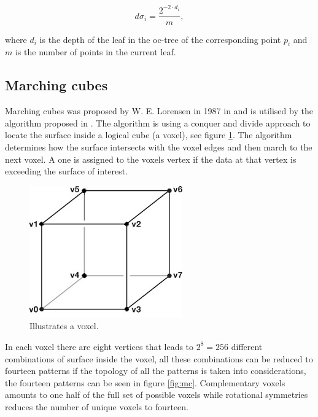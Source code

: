 \begin{equation}
	d \sigma_i = \frac{2^{-2 \cdot d_i}}{m},
	\label{eq:diff_area}
\end{equation}

\noindent where $d_i$ is the depth of the leaf in the oc-tree of the corresponding point $p_i$ and $m$ is the number of points in the current leaf.

\subsection{Marching cubes}
Marching cubes was proposed by W. E. Lorensen in 1987 in \cite{Lorensen:1987:MCH:37402.37422} and is utilised by the algorithm proposed in \cite{Manson2008}. The algorithm is using a conquer and divide approach to locate the surface inside a logical cube (a voxel), see figure \ref{fig:voxel}. The algorithm determines how the surface intersects with the voxel edges and then march to the next voxel. A one is assigned to the voxels vertex if the data at that vertex is exceeding the surface of interest.

\begin{figure}[htb]
	\begin{center}
		\includegraphics[scale=0.7,trim=0 0 0 0]{graphics/07_modelling/voxel.jpg}%
		\caption{Illustrates a voxel.}
		\label{fig:voxel}
	\end{center}
\end{figure}

\noindent In each voxel there are eight vertices that leads to $2^8 = 256$ different combinations of surface inside the voxel, all these combinations can be reduced to fourteen patterns if the topology of all the patterns is taken into considerations, the fourteen patterns can be seen in figure \ref{fig:mc}. Complementary voxels amounts to one half of the full set of possible voxels while rotational symmetries 
reduces the number of unique voxels to fourteen.

